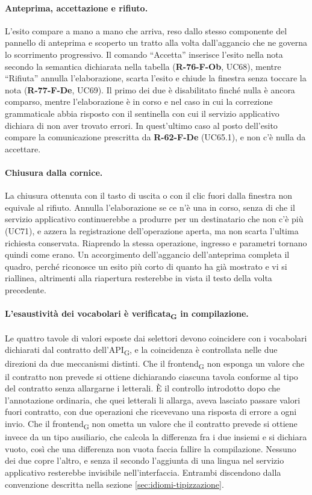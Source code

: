 \documentclass[a4paper, 10pt]{article}
\begin{document}
\paragraph{Anteprima, accettazione e rifiuto.}
L'esito compare a mano a mano che arriva, reso dallo stesso componente del pannello di anteprima e scoperto un tratto alla volta dall'aggancio che ne governa lo scorrimento progressivo. Il comando ``Accetta'' inserisce l'esito nella nota secondo la semantica dichiarata nella tabella (\textbf{R-76-F-Ob}, UC68), mentre ``Rifiuta'' annulla l'elaborazione, scarta l'esito e chiude la finestra senza toccare la nota (\textbf{R-77-F-De}, UC69). Il primo dei due è disabilitato finché nulla è ancora comparso, mentre l'elaborazione è in corso e nel caso in cui la correzione grammaticale abbia risposto con il sentinella con cui il servizio applicativo dichiara di non aver trovato errori. In quest'ultimo caso al posto dell'esito compare la comunicazione prescritta da \textbf{R-62-F-De} (UC65.1), e non c'è nulla da accettare.

\paragraph{Chiusura dalla cornice.}
La chiusura ottenuta con il tasto di uscita o con il clic fuori dalla finestra non equivale al rifiuto. Annulla l'elaborazione se ce n'è una in corso, senza di che il servizio applicativo continuerebbe a produrre per un destinatario che non c'è più (UC71), e azzera la registrazione dell'operazione aperta, ma non scarta l'ultima richiesta conservata. Riaprendo la stessa operazione, ingresso e parametri tornano quindi come erano. Un accorgimento dell'aggancio dell'anteprima completa il quadro, perché riconosce un esito più corto di quanto ha già mostrato e vi si riallinea, altrimenti alla riapertura resterebbe in vista il testo della volta precedente.

\paragraph{L'esaustività dei vocabolari è verificata\textsubscript{G} in compilazione.}
Le quattro tavole di valori esposte dai selettori devono coincidere con i vocabolari dichiarati dal contratto dell'API\textsubscript{G}, e la coincidenza è controllata nelle due direzioni da due meccanismi distinti. Che il frontend\textsubscript{G} non esponga un valore che il contratto non prevede si ottiene dichiarando ciascuna tavola conforme al tipo del contratto senza allargarne i letterali. È il controllo introdotto dopo che l'annotazione ordinaria, che quei letterali li allarga, aveva lasciato passare valori fuori contratto, con due operazioni che ricevevano una risposta di errore a ogni invio. Che il frontend\textsubscript{G} non ometta un valore che il contratto prevede si ottiene invece da un tipo ausiliario, che calcola la differenza fra i due insiemi e si dichiara vuoto, così che una differenza non vuota faccia fallire la compilazione. Nessuno dei due copre l'altro, e senza il secondo l'aggiunta di una lingua nel servizio applicativo resterebbe invisibile nell'interfaccia. Entrambi discendono dalla convenzione descritta nella sezione \ref{sec:idiomi-tipizzazione}.
\end{document}
